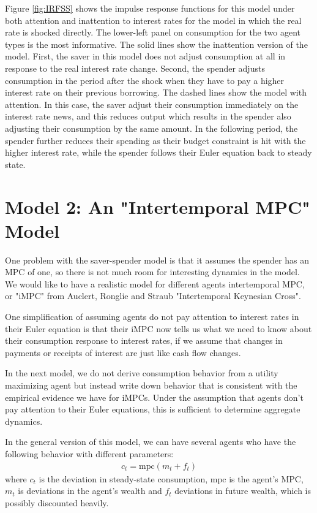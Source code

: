 \documentclass[AER]{AEA}
\begin{document}
Figure \ref{fig:IRFSS} shows the impulse response functions for this model under both attention and inattention to interest rates for the model in which the real rate is shocked directly. The lower-left panel on consumption for the two agent types is the most informative. The solid lines show the inattention version of the model. First, the saver in this model does not adjust consumption at all in response to the real interest rate change. Second, the spender adjusts consumption in the period after the shock when they have to pay a higher interest rate on their previous borrowing. The dashed lines show the model with attention. In this case, the saver adjust their consumption immediately on the interest rate news, and this reduces output which results in the spender also adjusting their consumption by the same amount. In the following period, the spender further reduces their spending as their budget constraint is hit with the higher interest rate, while the spender follows their Euler equation back to steady state.

\section{Model 2: An "Intertemporal MPC" Model}

One problem with the saver-spender model is that it assumes the spender has an MPC of one, so there is not much room for interesting dynamics in the model. We would like to have a realistic model for different agents intertemporal MPC, or "iMPC" from Auclert, Ronglie and Straub "Intertemporal Keynesian Cross". 

One simplification of assuming agents do not pay attention to interest rates in their Euler equation is that their iMPC now tells us what we need to know about their consumption response to interest rates, if we assume that changes in payments or receipts of interest are just like cash flow changes.

In the next model, we do not derive consumption behavior from a utility maximizing agent but instead write down behavior that is consistent with the empirical evidence we have for iMPCs. Under the assumption that agents don't pay attention to their Euler equations, this is sufficient to determine aggregate dynamics.

In the general version of this model, we can have several agents who have the following behavior with different parameters:
\begin{align}
	c_t = \text{mpc} (m_t + f_t)
\end{align}
where $c_t$ is the deviation in steady-state consumption, $\text{mpc}$ is the agent's MPC, $m_t$ is deviations in the agent's wealth and $f_t$ deviations in future wealth, which is possibly discounted heavily.
\end{document}
